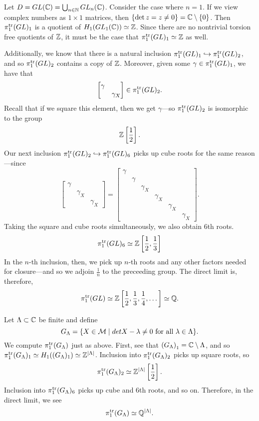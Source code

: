 \begin{example}
  Let \(D = GL(\mathbb{C}) = \bigcup_{n \in \mathbb{N}} GL_n(\mathbb{C})\). Consider the case where \(n =1\).
  If we view complex numbers as \(1\times 1\) matrices, then
  \(\{\det z = z \neq 0\} = \mathbb{C} \setminus \{0\} \). Then
  \(\pi_1^{\operatorname{tr}}(GL)_1\) is a quotient of \(H_1(GL_1(\mathbb{C}))\simeq \mathbb{Z} \).
  Since there are no nontrivial torsion free quotients of \(\mathbb{Z} \), it must be the case
  that \(\pi_1^{\operatorname{tr}}(GL)_1\simeq\mathbb{Z} \) as well.

  Additionally, we know that there is a natural inclusion
  \(\pi_1^{\operatorname{tr}}(GL)_1 \hookrightarrow \pi_1^{\operatorname{tr}}(GL)_2\), and so
  \(\pi_1^{\operatorname{tr}}(GL)_2\) contains a copy of \(\mathbb{Z} \). Moreover, given some
  \(\gamma \in \pi_1^{\operatorname{tr}}(GL)_1\), we have that
  \[
    \begin{bmatrix} \gamma&\\&\gamma_X \end{bmatrix} \in \pi_1^{\operatorname{tr}}(GL)_2.
  \]
  Recall that if we square this element, then we get \(\gamma\)---so
  \(\pi_1^{\operatorname{tr}}(GL)_2\) is isomorphic to the group
  \[
    \mathbb{Z} \left[\frac{1}{2}\right].
  \]
  Our next inclusion
  \(\pi_1^{\operatorname{tr}}(GL)_2\hookrightarrow \pi_1^{\operatorname{tr}}(GL)_6\) picks up cube roots for
  the same reason---since
  \[
    \begin{bmatrix} \gamma\\&\gamma_X\\&& \gamma_X  \end{bmatrix} =
    \begin{bmatrix} \gamma\\&\gamma\\&&\gamma_X\\&&&\gamma_X\\&&&&\gamma_X\\&&&&&\gamma_X  \end{bmatrix}.
  \]
  Taking the square and cube roots simultaneously, we also obtain 6th roots.
  \[
    \pi_1^{\operatorname{tr}}(GL)_6 \simeq \mathbb{Z} \left[\frac{1}{2}, \frac{1}{3}\right]
  \]
  In the \(n\)-th inclusion, then, we pick up \(n\)-th roots and any other
  factors needed for closure---and so we adjoin \(\frac{1}{n}\) to the
  preceeding group.
  The direct limit is, therefore,
  \[
    \pi_1^{\operatorname{tr}}(GL) \simeq \mathbb{Z} \left[\frac{1}{2},\frac{1}{3},\frac{1}{4}, \dots\right]\simeq \mathbb{Q}.
  \]
\end{example}

\begin{example}
  Let \(\Lambda \subset \mathbb{C} \) be finite and define
  \[
    G_\Lambda = \{ X \in \mathcal{M} \mid det X - \lambda \neq 0 \textrm{ for all
    } \lambda \in \Lambda\}.
  \]
  We compute \(\pi_1^{\operatorname{tr}}(G_\Lambda)\) just as above. First, see that
  \( \left( G_\Lambda \right) _1 = \mathbb{C} \setminus \Lambda\), and so
  \(\pi_1^{\operatorname{tr}}(G_\Lambda)_1\simeq H_1((G_\Lambda)_1)\simeq \mathbb{Z}^{|\Lambda|}\).
  Inclusion into \(\pi_1^{\operatorname{tr}}(G_\Lambda)_2\) picks up square roots, so
  \[
    \pi_1^{\operatorname{tr}}(G_\Lambda)_2 \simeq \mathbb{Z}^{|\Lambda|}\left[ \frac{1}{2} \right].
  \]
  Inclusion into \(\pi_1^{\operatorname{tr}}(G_\Lambda)_6\) picks up cube and 6th roots, and so
  on. Therefore, in the direct limit, we see
  \[
    \pi_1^{\operatorname{tr}}(G_\Lambda) \simeq \mathbb{Q} ^{|\Lambda|}.
  \]
\end{example}
